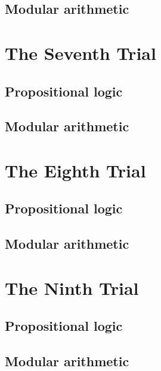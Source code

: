 \subsection{Modular arithmetic}



\section{The Seventh Trial} 

\subsection{Propositional logic}

 
\subsection{Modular arithmetic}



\section{The Eighth Trial} 

\subsection{Propositional logic}

 
\subsection{Modular arithmetic}



\section{The Ninth Trial} 

\subsection{Propositional logic}

 
\subsection{Modular arithmetic}

